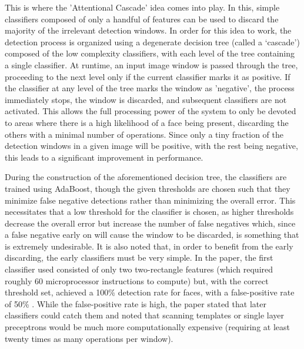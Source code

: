 \documentclass[11pt,a4paper,oldfontcommands]{memoir}
\begin{document}
This is where the 'Attentional Cascade' idea comes into play. In this, simple classifiers composed of only a handful of features can be used to discard the majority of the irrelevant detection windows. In order for this idea to work, the detection process is organized using a degenerate decision tree (called a `cascade') composed of the low complexity classifiers, with each level of the tree containing a single classifier. At runtime, an input image window is passed through the tree, proceeding to the next level only if the current classifier marks it as positive. If the classifier at any level of the tree marks the window as 'negative', the process immediately stops, the window is discarded, and subsequent classifiers are not activated. This allows the full processing power of the system to only be devoted to areas where there is a high likelihood of a face being present, discarding the others with a minimal number of operations. Since only a tiny fraction of the detection windows in a given image will be positive, with the rest being negative, this leads to a significant improvement in performance.





During the construction of the aforementioned decision tree, the classifiers are trained using AdaBoost, though the given thresholds are chosen such that they minimize false negative detections rather than minimizing the overall error. This necessitates that a low threshold for the classifier is chosen, as higher thresholds decrease the overall error but increase the number of false negatives which, since a false negative early on will cause the window to be discarded, is something that is extremely undesirable. It is also noted that, in order to benefit from the early discarding, the early classifiers must be very simple. In the paper, the first classifier used consisted of only two two-rectangle features (which required roughly 60 microprocessor instructions to compute) but, with the correct threshold set, achieved a 100\% detection rate for faces, with a false-positive rate of 50\% \cite{viola_updated}. While the false-positive rate is high, the paper stated that later classifiers could catch them and noted that scanning templates or single layer preceptrons would be much more computationally expensive (requiring at least twenty times as many operations per window). 
\end{document}
